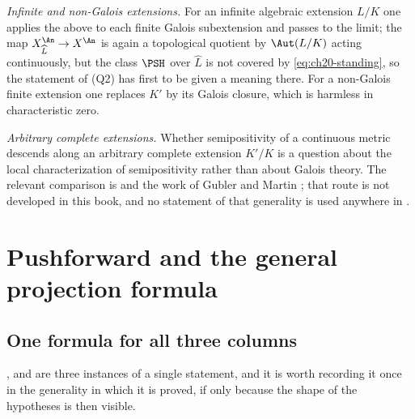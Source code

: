 \emph{Infinite and non-Galois extensions.}  For an infinite algebraic
extension \(L/K\) one applies the above to each finite Galois subextension
and passes to the limit; the map
\(X_{\widehat L}^{\An}\to X^{\An}\) is again a topological quotient by
\(\Aut(L/K)\) acting continuously, but the class \(\PSH\) over
\(\widehat L\) is not covered by \eqref{eq:ch20-standing}, so the
statement of (Q2) has first to be given a meaning there.  For a
non-Galois finite extension one replaces \(K'\) by its Galois closure,
which is harmless in characteristic zero.

\emph{Arbitrary complete extensions.}  Whether semipositivity of a
continuous metric descends along an arbitrary complete extension
\(K'/K\) is a question about the local characterization of semipositivity
rather than about Galois theory.  The relevant comparison is
 and the work of Gubler and Martin
\cite{GM19}; that route is not developed in this book, and no statement of
that generality is used anywhere in .

\section{Pushforward and the general projection formula}
\label{sec:ch30-pushforward}

\subsection{One formula for all three columns}
\label{sec:ch30-general-projection}

,
 and
 are three instances of a single statement, and it
is worth recording it once in the generality in which it is proved, if only
because the shape of the hypotheses is then visible.

